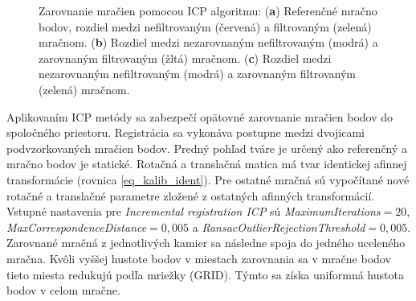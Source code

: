 \begin{figure}[h]
\begin{subfigure}[b]{0.32\textwidth}
		\caption{}
		\label{fig:icp:c}
	\end{subfigure}
	\caption{Zarovnanie mračien pomocou ICP algoritmu: (\textbf{a}) Referenčné mračno bodov, rozdiel medzi nefiltrovaným (červená) a filtrovaným (zelená) mračnom. (\textbf{b}) Rozdiel medzi nezarovnaným nefiltrovaným (modrá) a zarovnaným filtrovaným (žltá) mračnom. (\textbf{c}) Rozdiel medzi nezarovnaným nefiltrovaným (modrá) a zarovnaným filtrovaným (zelená) mračnom.}
	\label{fig:3dm}
\end{figure}

Aplikovaním ICP metódy sa zabezpečí opätovné zarovnanie mračien bodov do spoločného priestoru. Registrácia sa vykonáva postupne medzi dvojicami podvzorkovaných mračien bodov. Predný pohľad tváre je určený ako referenčný a mračno bodov je statické. Rotačná a translačná matica má tvar identickej afinnej transformácie (rovnica \ref{eq_kalib_ident}). Pre ostatné mračná sú vypočítané nové rotačné a translačné parametre zložené z ostatných afinných transformácií. Vstupné nastavenia pre \textit{Incremental registration ICP} \cite{iricp} sú \textit{MaximumIterations}$=20$, \textit{MaxCorrespondenceDistance}$=0,005$ a \textit{RansacOutlierRejectionThreshold}$=0,005$. Zarovnané mračná z jednotlivých kamier sa následne spoja do jedného uceleného mračna. Kvôli vyššej hustote bodov v miestach zarovnania sa v mračne bodov tieto miesta redukujú podľa mriežky (GRID). Týmto sa získa uniformná hustota bodov v celom mračne. 
